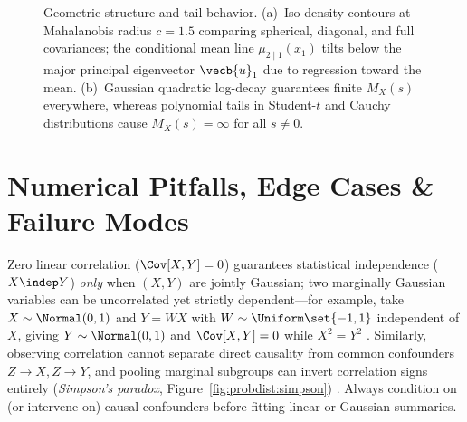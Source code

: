 \documentclass[../../../../master.tex]{subfiles}
\begin{document}
\begin{figure}[htbp]
\caption{Geometric structure and tail behavior. (a)~Iso-density contours at Mahalanobis radius $c=1.5$ comparing spherical, diagonal, and full covariances; the conditional mean line $\mu_{2\mid 1}(x_1)$ tilts below the major principal eigenvector $\vecb{u}_1$ due to regression toward the mean. (b)~Gaussian quadratic log-decay guarantees finite $M_X(s)$ everywhere, whereas polynomial tails in Student-$t$ and Cauchy distributions cause $M_X(s)=\infty$ for all $s \neq 0$.}
\label{fig:probdist:ellipses_pgfplots}
\end{figure}

\section{Numerical Pitfalls, Edge Cases \& Failure Modes}\label{sec:probdist:pitfalls}

\begin{pitfall}
Zero linear correlation ($\Cov[X,Y] = 0$) guarantees statistical independence ($X \indep Y$) \emph{only} when $(X,Y)$ are jointly Gaussian; two marginally Gaussian variables can be uncorrelated yet strictly dependent---for example, take $X \sim \Normal(0,1)$ and $Y = WX$ with $W \sim \Uniform\set{-1,1}$ independent of $X$, giving $Y \sim \Normal(0,1)$ and $\Cov[X,Y]=0$ while $X^2 = Y^2$ . Similarly, observing correlation cannot separate direct causality from common confounders $Z \to X, Z \to Y$, and pooling marginal subgroups can invert correlation signs entirely (\emph{Simpson's paradox}, Figure~\ref{fig:probdist:simpson}) . Always condition on (or intervene on) causal confounders before fitting linear or Gaussian summaries.
\end{pitfall}
\end{document}
